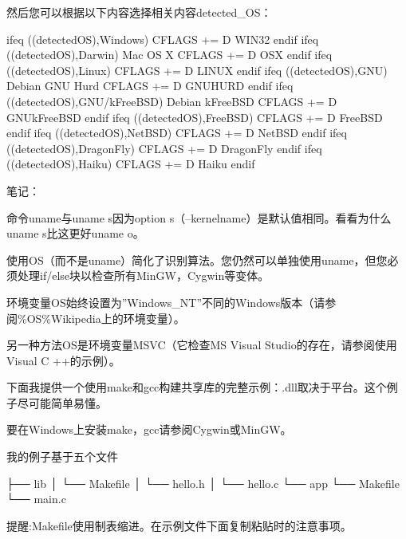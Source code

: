 \documentclass[letterpaper,12pt,english]{sphinxmanual}
\begin{document}
然后您可以根据以下内容选择相关内容detected\_OS：

\begin{sphinxVerbatim}[commandchars=\\\{\}]
ifeq (\PYGZdl{}(detected\PYGZus{}OS),Windows)
    CFLAGS += \PYGZhy{}D WIN32
endif
ifeq (\PYGZdl{}(detected\PYGZus{}OS),Darwin)        \PYGZsh{} Mac OS X
    CFLAGS += \PYGZhy{}D OSX
endif
ifeq (\PYGZdl{}(detected\PYGZus{}OS),Linux)
    CFLAGS   +=   \PYGZhy{}D LINUX
endif
ifeq (\PYGZdl{}(detected\PYGZus{}OS),GNU)           \PYGZsh{} Debian GNU Hurd
    CFLAGS   +=   \PYGZhy{}D GNU\PYGZus{}HURD
endif
ifeq (\PYGZdl{}(detected\PYGZus{}OS),GNU/kFreeBSD)  \PYGZsh{} Debian kFreeBSD
    CFLAGS   +=   \PYGZhy{}D GNU\PYGZus{}kFreeBSD
endif
ifeq (\PYGZdl{}(detected\PYGZus{}OS),FreeBSD)
    CFLAGS   +=   \PYGZhy{}D FreeBSD
endif
ifeq (\PYGZdl{}(detected\PYGZus{}OS),NetBSD)
    CFLAGS   +=   \PYGZhy{}D NetBSD
endif
ifeq (\PYGZdl{}(detected\PYGZus{}OS),DragonFly)
    CFLAGS   +=   \PYGZhy{}D DragonFly
endif
ifeq (\PYGZdl{}(detected\PYGZus{}OS),Haiku)
    CFLAGS   +=   \PYGZhy{}D Haiku
endif
\end{sphinxVerbatim}

笔记：

命令uname与uname \sphinxhyphen{}s因为option \sphinxhyphen{}s（–kernel\sphinxhyphen{}name）是默认值相同。看看为什么uname \sphinxhyphen{}s比这更好uname \sphinxhyphen{}o。

使用OS（而不是uname）简化了识别算法。您仍然可以单独使用uname，但您必须处理if/else块以检查所有MinGW，Cygwin等变体。

环境变量OS始终设置为”Windows\_NT”不同的Windows版本（请参阅\%OS\%Wikipedia上的环境变量）。

另一种方法OS是环境变量MSVC（它检查MS Visual Studio的存在，请参阅使用Visual C ++的示例）。

下面我提供一个使用make和gcc构建共享库的完整示例：.dll取决于平台。这个例子尽可能简单易懂。

要在Windows上安装make，gcc请参阅Cygwin或MinGW。

我的例子基于五个文件

\begin{sphinxVerbatim}[commandchars=\\\{\}]
├── lib
│   └── Makefile
│   └── hello.h
│   └── hello.c
└── app
    └── Makefile
    └── main.c
\end{sphinxVerbatim}

提醒:Makefile使用制表缩进。在示例文件下面复制粘贴时的注意事项。
\end{document}
